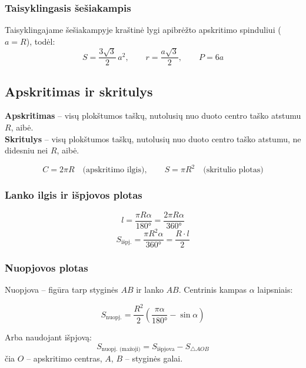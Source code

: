 \subsubsection*{Taisyklingasis šešiakampis}

Taisyklingajame šešiakampyje kraštinė lygi apibrėžto apskritimo spinduliui ($a = R$), todėl:
\[
S = \frac{3\sqrt{3}}{2}\,a^2, \qquad r = \frac{a\sqrt{3}}{2}, \qquad P = 6a
\]

\subsection{Apskritimas ir skritulys}

\begin{definition}
\textbf{Apskritimas} – visų plokštumos taškų, nutolusių nuo duoto centro taško atstumu $R$, aibė. \\
\textbf{Skritulys} – visų plokštumos taškų, nutolusių nuo duoto centro taško atstumu, ne didesniu nei $R$, aibė.
\end{definition}

\begin{tcolorbox}[title={Apskritimas ir skritulys (spindulys $R$)}]
\[
C = 2\pi R \quad \text{(apskritimo ilgis)}, \qquad S = \pi R^2 \quad \text{(skritulio plotas)}
\]
\end{tcolorbox}

\subsubsection*{Lanko ilgis ir išpjovos plotas}

\begin{tcolorbox}[title={Lankas ir išpjova (centrinis kampas $\alpha$ laipsniais)}]
\[
l = \frac{\pi R \alpha}{180°} = \frac{2\pi R \alpha}{360°}
\]
\[
S_{\text{išpj.}} = \frac{\pi R^2 \alpha}{360°} = \frac{R \cdot l}{2}
\]
\end{tcolorbox}

\subsubsection*{Nuopjovos plotas}

Nuopjova – figūra tarp styginės $AB$ ir lanko $AB$. Centrinis kampas $\alpha$ laipsniais:

\[
S_{\text{nuopj.}} = \frac{R^2}{2}\left(\frac{\pi\alpha}{180°} - \sin\alpha\right)
\]

Arba naudojant išpjovą:
\[
S_{\text{nuopj. (mažoji)}} = S_{\text{išpjova}} - S_{\triangle AOB}
\]
čia $O$ – apskritimo centras, $A$, $B$ – styginės galai.

